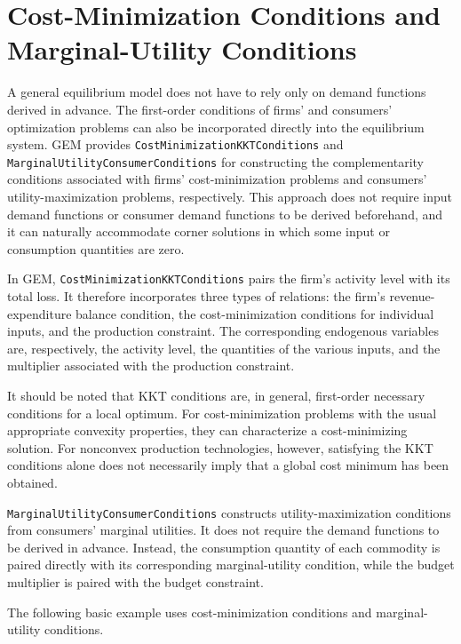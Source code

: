 \documentclass[
  letterpaper,
  DIV=11,
  numbers=noendperiod]{scrreprt}
\begin{document}
\section{Cost-Minimization Conditions and Marginal-Utility
Conditions}\label{cost-minimization-conditions-and-marginal-utility-conditions}

A general equilibrium model does not have to rely only on demand
functions derived in advance. The first-order conditions of firms' and
consumers' optimization problems can also be incorporated directly into
the equilibrium system. GEM provides
\texttt{CostMinimizationKKTConditions} and
\texttt{MarginalUtilityConsumerConditions} for constructing the
complementarity conditions associated with firms' cost-minimization
problems and consumers' utility-maximization problems, respectively.
This approach does not require input demand functions or consumer demand
functions to be derived beforehand, and it can naturally accommodate
corner solutions in which some input or consumption quantities are zero.

In GEM, \texttt{CostMinimizationKKTConditions} pairs the firm's activity
level with its total loss. It therefore incorporates three types of
relations: the firm's revenue-expenditure balance condition, the
cost-minimization conditions for individual inputs, and the production
constraint. The corresponding endogenous variables are, respectively,
the activity level, the quantities of the various inputs, and the
multiplier associated with the production constraint.

It should be noted that KKT conditions are, in general, first-order
necessary conditions for a local optimum. For cost-minimization problems
with the usual appropriate convexity properties, they can characterize a
cost-minimizing solution. For nonconvex production technologies,
however, satisfying the KKT conditions alone does not necessarily imply
that a global cost minimum has been obtained.

\texttt{MarginalUtilityConsumerConditions} constructs
utility-maximization conditions from consumers' marginal utilities. It
does not require the demand functions to be derived in advance. Instead,
the consumption quantity of each commodity is paired directly with its
corresponding marginal-utility condition, while the budget multiplier is
paired with the budget constraint.

The following basic example uses cost-minimization conditions and
marginal-utility conditions.
\end{document}
